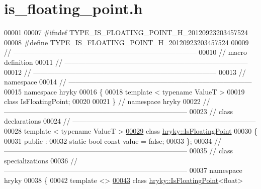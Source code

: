 \hypertarget{is__floating__point_8h_source}{\section{is\-\_\-floating\-\_\-point.\-h}
}

\begin{DoxyCode}
00001 
00007 \textcolor{preprocessor}{#ifndef TYPE\_IS\_FLOATING\_POINT\_H\_20120923203457524}
00008 \textcolor{preprocessor}{}\textcolor{preprocessor}{#define TYPE\_IS\_FLOATING\_POINT\_H\_20120923203457524}
00009 \textcolor{preprocessor}{}\textcolor{comment}{//
      ------------------------------------------------------------------------------}
00010 \textcolor{comment}{// macro definition}
00011 \textcolor{comment}{//
      ------------------------------------------------------------------------------}
00012 \textcolor{comment}{//
      ------------------------------------------------------------------------------}
00013 \textcolor{comment}{// namespace}
00014 \textcolor{comment}{//
      ------------------------------------------------------------------------------}
00015 \textcolor{keyword}{namespace }hryky
00016 \{
00018     \textcolor{keyword}{template} < \textcolor{keyword}{typename} ValueT >
00019     \textcolor{keyword}{class }IsFloatingPoint;
00020 
00021 \} \textcolor{comment}{// namespace hryky}
00022 \textcolor{comment}{//
      ------------------------------------------------------------------------------}
00023 \textcolor{comment}{// class declarations}
00024 \textcolor{comment}{//
      ------------------------------------------------------------------------------}
00028 \textcolor{comment}{}\textcolor{keyword}{template} < \textcolor{keyword}{typename} ValueT >
\hypertarget{is__floating__point_8h_source_l00029}{}\hyperlink{classhryky_1_1_is_floating_point}{00029} \textcolor{keyword}{class }\hyperlink{classhryky_1_1_is_floating_point}{hryky::IsFloatingPoint}
00030 \{
00031 \textcolor{keyword}{public} :
00032     \textcolor{keyword}{static} \textcolor{keywordtype}{bool} \textcolor{keyword}{const} value = \textcolor{keyword}{false};
00033 \};
00034 \textcolor{comment}{//
      ------------------------------------------------------------------------------}
00035 \textcolor{comment}{// class specializations}
00036 \textcolor{comment}{//
      ------------------------------------------------------------------------------}
00037 \textcolor{keyword}{namespace }hryky
00038 \{
00042 \textcolor{keyword}{template} <>
\hypertarget{is__floating__point_8h_source_l00043}{}\hyperlink{classhryky_1_1hryky_1_1_is_floating_point_3_01float_01_4}{00043} \textcolor{keyword}{class }\hyperlink{classhryky_1_1_is_floating_point}{hryky::IsFloatingPoint}<float>

\end{DoxyCode}
